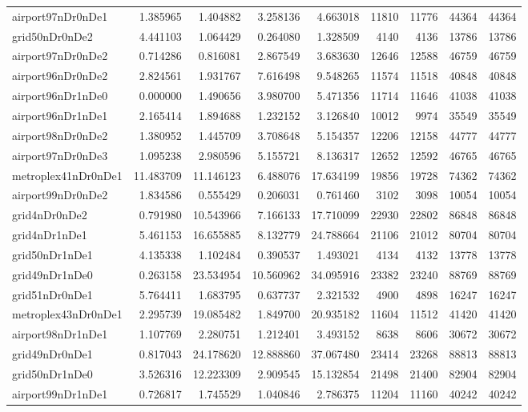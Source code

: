 \begin{longtable}{|l|r|r|r|r|r|r|r|r|}
airport97nDr0nDe1 & 1.385965 & 1.404882 & 3.258136 & 4.663018 & 11810 & 11776 & 44364 & 44364 \\
grid50nDr0nDe2 & 4.441103 & 1.064429 & 0.264080 & 1.328509 & 4140 & 4136 & 13786 & 13786 \\
airport97nDr0nDe2 & 0.714286 & 0.816081 & 2.867549 & 3.683630 & 12646 & 12588 & 46759 & 46759 \\
airport96nDr0nDe2 & 2.824561 & 1.931767 & 7.616498 & 9.548265 & 11574 & 11518 & 40848 & 40848 \\
airport96nDr1nDe0 & 0.000000 & 1.490656 & 3.980700 & 5.471356 & 11714 & 11646 & 41038 & 41038 \\
airport96nDr1nDe1 & 2.165414 & 1.894688 & 1.232152 & 3.126840 & 10012 & 9974 & 35549 & 35549 \\
airport98nDr0nDe2 & 1.380952 & 1.445709 & 3.708648 & 5.154357 & 12206 & 12158 & 44777 & 44777 \\
airport97nDr0nDe3 & 1.095238 & 2.980596 & 5.155721 & 8.136317 & 12652 & 12592 & 46765 & 46765 \\
metroplex41nDr0nDe1 & 11.483709 & 11.146123 & 6.488076 & 17.634199 & 19856 & 19728 & 74362 & 74362 \\
airport99nDr0nDe2 & 1.834586 & 0.555429 & 0.206031 & 0.761460 & 3102 & 3098 & 10054 & 10054 \\
grid4nDr0nDe2 & 0.791980 & 10.543966 & 7.166133 & 17.710099 & 22930 & 22802 & 86848 & 86848 \\
grid4nDr1nDe1 & 5.461153 & 16.655885 & 8.132779 & 24.788664 & 21106 & 21012 & 80704 & 80704 \\
grid50nDr1nDe1 & 4.135338 & 1.102484 & 0.390537 & 1.493021 & 4134 & 4132 & 13778 & 13778 \\
grid49nDr1nDe0 & 0.263158 & 23.534954 & 10.560962 & 34.095916 & 23382 & 23240 & 88769 & 88769 \\
grid51nDr0nDe1 & 5.764411 & 1.683795 & 0.637737 & 2.321532 & 4900 & 4898 & 16247 & 16247 \\
metroplex43nDr0nDe1 & 2.295739 & 19.085482 & 1.849700 & 20.935182 & 11604 & 11512 & 41420 & 41420 \\
airport98nDr1nDe1 & 1.107769 & 2.280751 & 1.212401 & 3.493152 & 8638 & 8606 & 30672 & 30672 \\
grid49nDr0nDe1 & 0.817043 & 24.178620 & 12.888860 & 37.067480 & 23414 & 23268 & 88813 & 88813 \\
grid50nDr1nDe0 & 3.526316 & 12.223309 & 2.909545 & 15.132854 & 21498 & 21400 & 82904 & 82904 \\
airport99nDr1nDe1 & 0.726817 & 1.745529 & 1.040846 & 2.786375 & 11204 & 11160 & 40242 & 40242 \\

\end{longtable}
